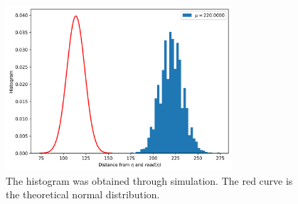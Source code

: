 \documentclass[12pt]{article}
\begin{document}
\begin{figure}[h!]
  \centering
  \includegraphics[width=0.75\textwidth]{./images02/autocorrelation/read-random-bs.png}

  \caption{The histogram was obtained through simulation. The red curve is the theoretical normal distribution.}
  \label{fig:sdm-read-random-bs}
\end{figure}
\end{document}
